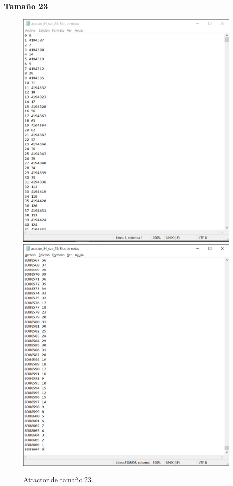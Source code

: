 \documentclass[11pt]{article}
\begin{document}
			\subsubsection{Tamaño 23}
			\begin{figure}[H]
			\centering
			\includegraphics[scale=0.3]{resources/Atractores54/atractor_54_size_23.png}
			\includegraphics[scale=0.3]{resources/Atractores54/atractor_54_size_231.png}
			\caption{Atractor de tamaño 23.}\label{fig:picture}
			\end{figure}
\end{document}
